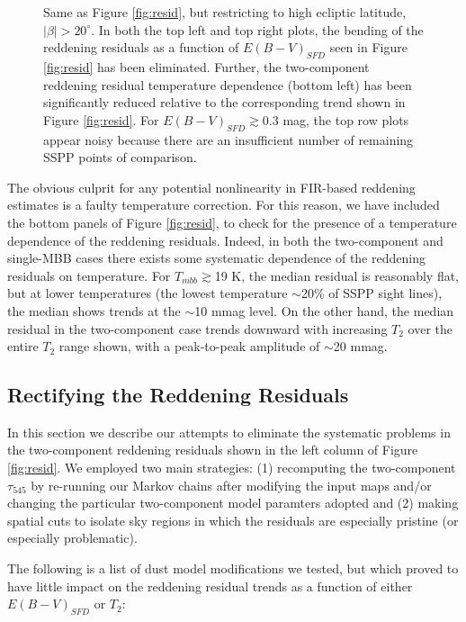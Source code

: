 \documentclass{emulateapj}
\begin{document}
\begin{figure*}
\begin{center}
\caption{\label{fig:resid_ecl} Same as Figure \ref{fig:resid}, but restricting 
to high ecliptic latitude, $|\beta|>20^{\circ}$. In both the top left and top 
right plots, the bending of the reddening residuals as a function of 
$E(B-V)_{SFD}$ seen in Figure \ref{fig:resid} has been eliminated. Further, the
two-component reddening residual temperature dependence (bottom left) has been 
significantly reduced relative to the corresponding trend shown in Figure 
\ref{fig:resid}. For $E(B-V)_{SFD}$$\gtrsim$0.3 mag, the top row plots appear 
noisy because there are an insufficient number of remaining SSPP points of 
comparison.}
\end{center}
\end{figure*}

The obvious culprit for any potential nonlinearity in FIR-based reddening
estimates is a faulty temperature correction. For this reason, we have included
the bottom panels of Figure \ref{fig:resid}, to check for the presence of a 
temperature dependence of the reddening residuals. Indeed, in both the
two-component and single-MBB cases there exists some systematic dependence of
the reddening residuals on temperature. For $T_{mbb}$$\gtrsim$19 K, the median 
residual is reasonably flat, but at lower temperatures (the lowest temperature 
$\sim$20\% of SSPP sight lines), the median shows trends at the $\sim$10 mmag 
level. On the other hand, the median residual in the two-component case trends 
downward with increasing $T_2$ over the entire $T_2$ range shown, with a 
peak-to-peak amplitude of $\sim$20 mmag.

\subsection{Rectifying the Reddening Residuals}

In this section we describe our attempts to eliminate the systematic problems 
in the two-component reddening residuals shown in the left column of Figure 
\ref{fig:resid}. We employed two main strategies: (1) recomputing the 
two-component $\tau_{545}$ by re-running our Markov chains after modifying the 
input maps and/or changing the particular two-component model paramters adopted
and (2) making spatial cuts to isolate sky regions in which the residuals are 
especially pristine (or especially problematic).

The following is a list of dust model modifications we tested, but which proved
to have little impact on the reddening residual trends as a function of either 
$E(B-V)_{SFD}$ or $T_2$:
\end{document}
